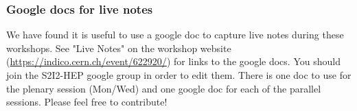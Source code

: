 \begin{frame}
\frametitle{Google docs for live notes}

We have found it is useful to use a google doc to capture live notes during these workshops. 
\vskip 0.15in
See "Live Notes" on the workshop website (\url{https://indico.cern.ch/event/622920/}) for links to the google docs. You should join the S2I2-HEP google group in order to edit them.
\vskip 0.15in
There is one doc to use for the plenary session (Mon/Wed) and one google doc for each of the parallel sessions. Please feel free to contribute!

\end{frame}


